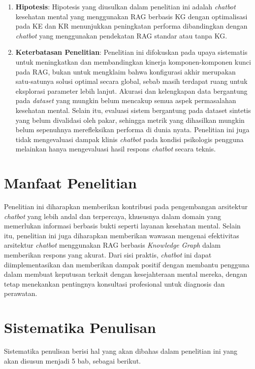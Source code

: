 \begin{enumerate}
	\item	\textbf{Hipotesis}: Hipotesis yang diusulkan dalam penelitian ini adalah \textit{chatbot} kesehatan mental yang menggunakan RAG berbasis KG dengan optimalisasi pada KE dan KR menunjukkan peningkatan performa dibandingkan dengan \textit{chatbot} yang menggunakan pendekatan RAG standar atau tanpa KG.
	\item	\textbf{Keterbatasan Penelitian}: Penelitian ini difokuskan pada upaya sistematis untuk meningkatkan dan membandingkan kinerja komponen-komponen kunci pada RAG, bukan untuk mengklaim bahwa konfigurasi akhir merupakan satu-satunya solusi optimal secara global, sebab masih terdapat ruang untuk eksplorasi parameter lebih lanjut.
	      Akurasi dan kelengkapan data bergantung pada \textit{dataset} yang mungkin belum mencakup semua aspek permasalahan kesehatan mental.
	      Selain itu, evaluasi sistem bergantung pada dataset sintetis yang belum divalidasi oleh pakar, sehingga metrik yang dihasilkan mungkin belum sepenuhnya merefleksikan performa di dunia nyata.
	      Penelitian ini juga tidak mengevaluasi dampak klinis \textit{chatbot} pada kondisi psikologis pengguna melainkan hanya mengevaluasi hasil respons \textit{chatbot} secara teknis.
\end{enumerate}

\section{Manfaat Penelitian}
Penelitian ini diharapkan memberikan kontribusi pada pengembangan arsitektur \textit{chatbot} yang lebih andal dan terpercaya, khususnya dalam domain yang memerlukan informasi berbasis bukti seperti layanan kesehatan mental.
Selain itu, penelitian ini juga diharapkan memberikan wawasan mengenai efektivitas arsitektur \textit{chatbot} menggunakan RAG berbasis \textit{Knowledge Graph} dalam memberikan respons yang akurat.
Dari sisi praktis, \textit{chatbot} ini dapat diimplementasikan dan memberikan dampak positif dengan membantu pengguna dalam membuat keputusan terkait dengan kesejahteraan mental mereka, dengan tetap menekankan pentingnya konsultasi profesional untuk diagnosis dan perawatan.
\section{Sistematika Penulisan}
Sistematika penulisan berisi hal yang akan dibahas dalam penelitian ini yang akan disusun menjadi 5 bab, sebagai berikut.

